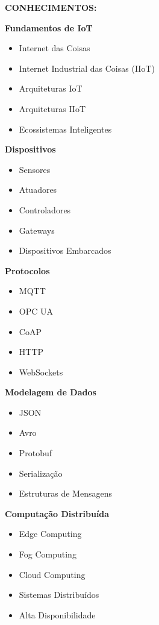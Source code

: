 \textbf{CONHECIMENTOS:}

\textbf{Fundamentos de IoT}

\begin{itemize}
\item Internet das Coisas
\item Internet Industrial das Coisas (IIoT)
\item Arquiteturas IoT
\item Arquiteturas IIoT
\item Ecossistemas Inteligentes
\end{itemize}

\textbf{Dispositivos}

\begin{itemize}
\item Sensores
\item Atuadores
\item Controladores
\item Gateways
\item Dispositivos Embarcados
\end{itemize}

\textbf{Protocolos}

\begin{itemize}
\item MQTT
\item OPC UA
\item CoAP
\item HTTP
\item WebSockets
\end{itemize}

\textbf{Modelagem de Dados}

\begin{itemize}
\item JSON
\item Avro
\item Protobuf
\item Serialização
\item Estruturas de Mensagens
\end{itemize}

\textbf{Computação Distribuída}

\begin{itemize}
\item Edge Computing
\item Fog Computing
\item Cloud Computing
\item Sistemas Distribuídos
\item Alta Disponibilidade
\end{itemize}

